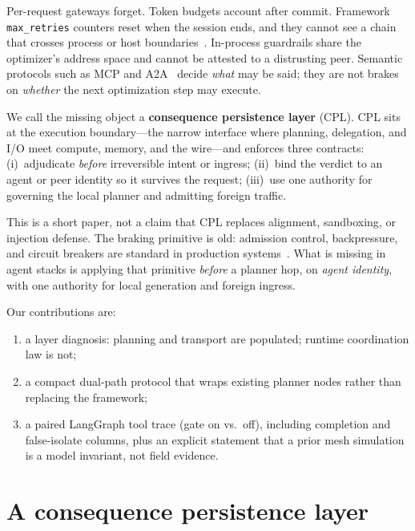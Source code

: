 \documentclass{article}
\begin{document}
Per-request gateways forget.
Token budgets account after commit.
Framework \texttt{max\_retries} counters reset when the session ends, and they cannot see a chain that crosses process or host boundaries~\cite{cemri2025why}.
In-process guardrails share the optimizer's address space and cannot be attested to a distrusting peer.
Semantic protocols such as MCP and A2A~\cite{anthropic2024mcp,google2025a2a} decide \emph{what} may be said; they are not brakes on \emph{whether} the next optimization step may execute.

We call the missing object a \textbf{consequence persistence layer} (CPL).
CPL sits at the execution boundary---the narrow interface where planning, delegation, and I/O meet compute, memory, and the wire---and enforces three contracts:
(i)~adjudicate \emph{before} irreversible intent or ingress;
(ii)~bind the verdict to an agent or peer identity so it survives the request;
(iii)~use one authority for governing the local planner and admitting foreign traffic.

This is a short paper, not a claim that CPL replaces alignment, sandboxing, or injection defense.
The braking primitive is old: admission control, backpressure, and circuit breakers are standard in production systems~\cite{nygard2018release,fowler2014circuit,jacobson1988congestion,welsh2001seda,netflix2012hystrix,envoy2024circuit}.
What is missing in agent stacks is applying that primitive \emph{before} a planner hop, on \emph{agent identity}, with one authority for local generation and foreign ingress.

Our contributions are:
\begin{enumerate}
    \item a layer diagnosis: planning and transport are populated; runtime coordination law is not;
    \item a compact dual-path protocol that wraps existing planner nodes rather than replacing the framework;
    \item a paired LangGraph tool trace (gate on vs.\ off), including completion and false-isolate columns, plus an explicit statement that a prior mesh simulation is a model invariant, not field evidence.
\end{enumerate}

\section{A consequence persistence layer}
\label{sec:method}
\end{document}
